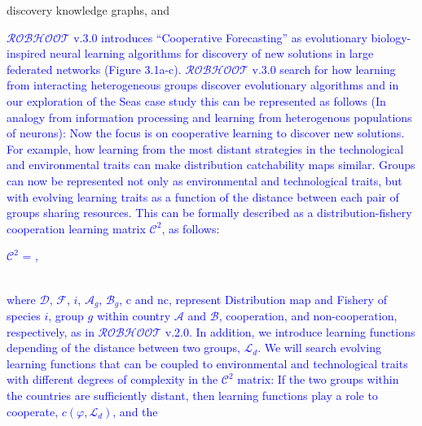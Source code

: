 \documentclass[11pt, a4paper]{article} %
\begin{document}
discovery knowledge graphs, and \textcolor{blue}{$\mathcal{ROBHOOT}$
  v.3.0 introduces ``Cooperative Forecasting'' as evolutionary
  biology-inspired neural learning algorithms for discovery of new
  solutions in large federated networks (Figure
  3.1a-c). $\mathcal{ROBHOOT}$ v.3.0 search for how learning from
  interacting heterogeneous groups discover evolutionary algorithms
  and in our exploration of the Seas case study this can be
  represented as follows (In analogy from information processing and
  learning from heterogenous populations of neurons): Now the focus is
  on cooperative learning to discover new solutions. For example, how
  learning from the most distant strategies in the technological and
  environmental traits can make distribution catchability maps
  similar. Groups can now be represented not only as environmental and
  technological traits, but with evolving learning traits as a
  function of the distance between each pair of groups sharing
  resources. This can be formally
  described as a distribution-fishery cooperation learning matrix $\mathcal{C}^2$, as follows: \vspace{0.2 in}\\
\begin{center}
  $\mathcal{C}^2$ = , \vspace{0.2 in}
\end{center}
\\
where $\mathcal{D}$, $\mathcal{F}$, $i$, $\mathcal{A}_{g}$,
$\mathcal{B}_{g}$, c and nc, represent Distribution map and Fishery of
species $i$, group $g$ within country $\mathcal{A}$ and $\mathcal{B}$,
cooperation, and non-cooperation, respectively, as in
$\mathcal{ROBHOOT}$ v.2.0. In addition, we introduce learning
functions depending of the distance between two groups,
$\mathcal{L}_{d}$. We will search evolving learning functions that can
be coupled to environmental and technological traits with different
degrees of complexity in the $\mathcal{C}^2$ matrix: If the two groups
within the countries are sufficiently distant, then learning functions
play a role to cooperate, $c(\varphi, \mathcal{L}_{d})$, and the
}
\end{document}
